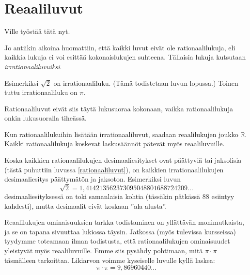 \chapter{Reaaliluvut}

Ville työstää tätä nyt.

Jo antiikin aikoina huomattiin, että kaikki luvut eivät ole rationaalilukuja, eli kaikkia lukuja ei voi esittää kokonaislukujen suhteena. Tällaisia lukuja kutsutaan \emph{irrationaaliluvuiksi}.

Esimerkiksi $\sqrt{2}$ on irrationaaliluku. (Tämä todistetaan
luvun lopussa.) Toinen tuttu irrationaaliluku on $\pi$.

Rationaaliluvut eivät siis täytä lukusuoraa kokonaan, vaikka
rationaalilukuja onkin lukusuoralla tiheässä.


Kun rationaalilukuihin lisätään irrationaaliluvut, saadaan reaalilukujen joukko $\mathbb{R}$. Kaikki rationaalilukuja koskevat
laskusäännöt pätevät myös reaaliluvuille.

Koska kaikkien rationaalilukujen desimaaliesitykset ovat päättyviä tai jaksolisia (tästä puhuttiin luvussa \ref{rationaaliluvut}), on
kaikkien irrationaalilukujen desimaaliesitys päättymätön ja jaksoton. Esimerkiksi luvun
\[\sqrt{2}= 1,414213562373095048801688724209\ldots\]
desimaaliesityksessä on toki samanlaisia kohtia
(tässäkin pätkässä 88 esiintyy kahdesti), mutta desimaalit eivät koskaan ''ala alusta''.

Reaalilukujen ominaisuuksien tarkka todistaminen on yllättävän monimutkaista, ja se on tapana sivuuttaa lukiossa täysin. Jatkossa
(myös tulevissa kursseissa) tyydymme toteamaan ilman todistusta, että rationaalilukujen ominaisuudet yleistyvät myös reaaliluvuille.
Emme siis pysähdy pohtimaan, mitä $\pi \cdot \pi$ täsmälleen tarkoittaa. Likiarvon voimme kyseiselle luvulle kyllä laskea:
\[ \pi\cdot \pi =9,86960440\ldots \]

